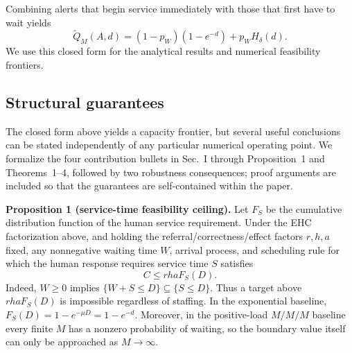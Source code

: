 \documentclass[letterpaper,10pt,conference]{ieeeconf}
\begin{document}
Combining alerts that begin service immediately with those that first have to
wait yields
\begin{equation}
\widetilde Q_M(A,d)
=
(1-p_W)(1-e^{-d})
+
p_W H_{\delta}(d).
\label{eq:qexact}
\end{equation}
We use this closed form for the analytical results and numerical feasibility
frontiers.

\subsection{Structural guarantees}
\label{sec:guarantees}

The closed form above yields a capacity frontier, but several useful conclusions
can be stated independently of any particular numerical operating point. We
formalize the four contribution bullets in Sec.~I through Proposition~1 and
Theorems~1--4, followed by two robustness consequences; proof arguments are
included so that the guarantees are self-contained within the paper.

\textbf{Proposition 1 (service-time feasibility ceiling).}
Let $F_S$ be the cumulative distribution function of the human service requirement. Under the EHC factorization above, and holding the referral/correctness/effect factors \(r,h,a\) fixed, any nonnegative waiting time $W$, arrival process, and scheduling rule for which the human response requires service time $S$ satisfies
\begin{equation}
C\le rha F_S(D).
\label{eq:service-ceiling}
\end{equation}
Indeed, $W\ge0$ implies
$\{W+S\le D\}\subseteq\{S\le D\}$. Thus a target above
$rhaF_S(D)$ is impossible regardless of staffing. In the exponential
baseline, $F_S(D)=1-e^{-\mu D}=1-e^{-d}$. Moreover, in the positive-load
$M/M/M$ baseline every finite $M$ has a nonzero probability of waiting, so
the boundary value itself can only be approached as $M\to\infty$.
\end{document}

